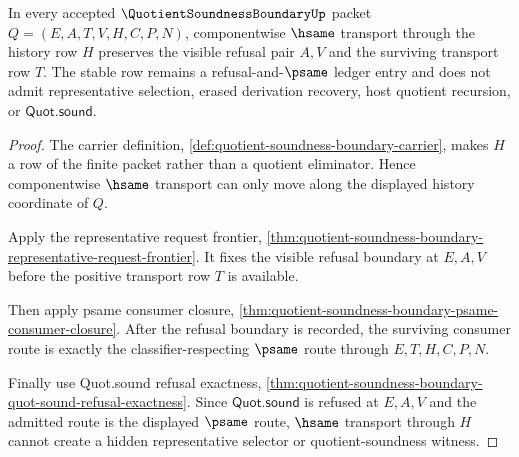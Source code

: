 \begin{theorem}
\label{thm:quotient-soundness-boundary-refusal-stability-row}
In every accepted $\QuotientSoundnessBoundaryUp$ packet $Q=(E,A,T,V,H,C,P,N)$, componentwise $\hsame$ transport through the history row $H$ preserves the visible refusal pair $A,V$ and the surviving transport row $T$. The stable row remains a refusal-and-$\psame$ ledger entry and does not admit representative selection, erased derivation recovery, host quotient recursion, or $\mathsf{Quot.sound}$.
\end{theorem}
\begin{proof}
The carrier definition, \autoref{def:quotient-soundness-boundary-carrier}, makes $H$ a row of the finite packet rather than a quotient eliminator. Hence componentwise $\hsame$ transport can only move along the displayed history coordinate of $Q$.

Apply the representative request frontier, \autoref{thm:quotient-soundness-boundary-representative-request-frontier}. It fixes the visible refusal boundary at $E,A,V$ before the positive transport row $T$ is available.

Then apply psame consumer closure, \autoref{thm:quotient-soundness-boundary-psame-consumer-closure}. After the refusal boundary is recorded, the surviving consumer route is exactly the classifier-respecting $\psame$ route through $E,T,H,C,P,N$.

Finally use Quot.sound refusal exactness, \autoref{thm:quotient-soundness-boundary-quot-sound-refusal-exactness}. Since $\mathsf{Quot.sound}$ is refused at $E,A,V$ and the admitted route is the displayed $\psame$ route, $\hsame$ transport through $H$ cannot create a hidden representative selector or quotient-soundness witness.
\end{proof}

